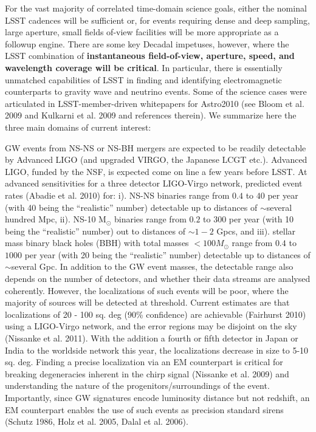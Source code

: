 \documentclass [11pt]{article}
\begin{document}
For the vast majority of correlated time-domain science goals, either the nominal LSST cadences will be sufficient or, for events requiring dense and deep sampling, large aperture, small fields of-view facilities will be more appropriate as a followup engine. There are some key Decadal impetuses, however, where the LSST combination of {\bf instantaneous field-of-view, aperture, speed, and wavelength coverage will be critical}. In particular, there is essentially unmatched capabilities of LSST in finding and identifying electromagnetic counterparts to gravity wave and neutrino events. Some of the science cases were articulated in LSST-member-driven whitepapers for Astro2010 (see Bloom et al. 2009 and Kulkarni et al. 2009 and references therein). We summarize here the three main domains of current interest:

\medskip

 GW events from NS-NS or NS-BH mergers are expected to be readily detectable by Advanced LIGO (and upgraded VIRGO, the Japanese LCGT etc.). Advanced LIGO, funded by the NSF, is expected come on line a few years before LSST. At advanced sensitivities for a three detector LIGO-Virgo network, predicted event rates (Abadie et al. 2010) 
for: i). NS-NS binaries range from $0.4$ to $40$ per year (with 40 being the ``realistic'' number) detectable up to distances of
$\sim$several hundred Mpc, ii). NS-10 M$_{\odot}$ binaries range from $0.2$ to $300$ per year (with 10 being the ``realistic'' number) out to distances of $\sim 1-2$ Gpcs, and iii). stellar mass binary black holes (BBH) with total masses $<100 M_{\odot}$ range from $0.4$ to $1000$ per year (with 20 being the ``realistic'' number) detectable up to distances of $\sim$several Gpc. In addition to the GW event masses, the detectable range also depends on the number of detectors, and whether their data streams are analysed coherently. However, the localizations of such events will be poor, where the majority of sources will be detected at threshold. Current estimates are that localizations of 20 - 100 sq. deg (90\% confidence) are achievable (Fairhurst 2010) using a LIGO-Virgo network, and the error regions may be disjoint on the sky (Nissanke et al. 2011). With the addition a fourth or fifth detector  in Japan or India to the worldside network this year, the localizations decrease in size to 5-10 sq. deg. Finding a precise localization via an EM counterpart is critical for breaking degeneracies inherent in the chirp signal (Nissanke et al. 2009) and understanding the nature of the progenitors/surroundings of the event. Importantly, since GW signatures encode luminosity distance but not redshift, an EM counterpart enables the use of such events as precision standard sirens (Schutz 1986, Holz et al. 2005, Dalal et al. 2006). 
\end{document}
